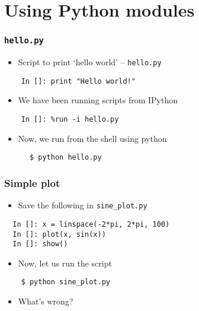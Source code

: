 \section{Using Python modules}

\begin{frame}[fragile]
  \frametitle{\texttt{hello.py}}
    \begin{itemize}
    \item Script to print `hello world' -- \texttt{hello.py}
    \end{itemize}
    \begin{lstlisting}
    In []: print "Hello world!"
    \end{lstlisting}
    \begin{itemize}
    \item We have been running scripts from IPython
    \end{itemize}
    \begin{lstlisting}
    In []: %run -i hello.py
    \end{lstlisting}
    \begin{itemize}
    \item Now, we run from the shell using python
    \end{itemize}
    \begin{lstlisting}
      $ python hello.py
    \end{lstlisting} %
\end{frame}

\begin{frame}[fragile]
  \frametitle{Simple plot}
  \begin{itemize}
  \item Save the following in \texttt{sine\_plot.py} 
  \end{itemize}
  \begin{lstlisting}
  In []: x = linspace(-2*pi, 2*pi, 100)
  In []: plot(x, sin(x))
  In []: show()
  \end{lstlisting}
  \begin{itemize}
  \item Now, let us run the script
  \end{itemize}
  \begin{lstlisting}
    $ python sine_plot.py
  \end{lstlisting} %
  \begin{itemize}
  \item What's wrong?
  \end{itemize}
\end{frame}



